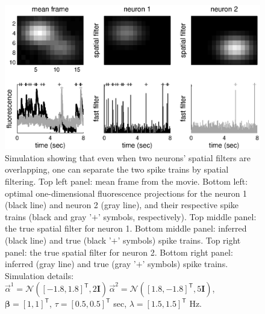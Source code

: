 \documentclass{article}
\providecommand{\ve}[1]{\boldsymbol{#1}}
\newcommand{\T}{^{\ensuremath{\mathsf{T}}}}           %
\newcommand{\bI}{\ve{I}}
\newcommand{\mN}{\mathcal{N}}
\newcommand{\lam}{\lambda}
\newcommand{\bbeta}{\ve{\beta}}
\newcommand{\valpha}{\vec{\alpha}}
\begin{document}
\begin{figure}[h!]
\centering \includegraphics[width=.9\linewidth]{spatial_multi_inf}
\caption[overlapping spatial filters are not problematic]{Simulation showing that even when two neurons' spatial filters are overlapping, one can separate the two spike trains by spatial filtering. Top left panel: mean frame from the movie.  Bottom left: optimal one-dimensional fluorescence projections for the neuron 1 (black line) and neuron 2 (gray line), and their respective spike trains (black and gray '$+$' symbols, respectively).  Top middle panel: the true spatial filter for neuron 1.  Bottom middle panel: inferred (black line) and true (black '$+$' symbols) spike trains.  Top right panel: the true spatial filter for neuron 2.   Bottom right panel: inferred (gray line) and true (gray '$+$' symbols) spike trains. Simulation details: $\valpha^1=\mN([-1.8, 1.8]\T,2 \bI)\, \valpha^2=\mN([1.8, -1.8]\T,5 \bI)$, $\bbeta=[1, 1]\T$, $\tau=[0.5, 0.5]\T$ sec, $\lam=[1.5, 1.5]\T$ Hz.} \label{fig:spatial_multi_inf}
\end{figure}
\end{document}
